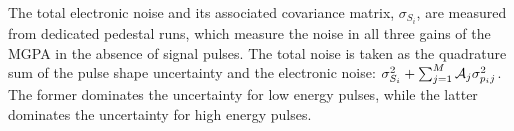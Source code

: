 \documentclass[journal]{IEEEtran}
\begin{document}
The total electronic noise and its associated covariance matrix, $\sigma_{S_i}$, are measured from dedicated pedestal runs, which measure the noise in all three gains of the MGPA in the absence of signal pulses. The total noise is taken as the quadrature sum of the pulse shape uncertainty and the electronic noise: $\sigma_{S_i}^2+\sum_{j=1}^M {\cal A}_{j}\sigma_{p_ij}^2$. The former dominates the uncertainty for low energy pulses, while the latter dominates the uncertainty for high energy pulses.


%
\end{document}
